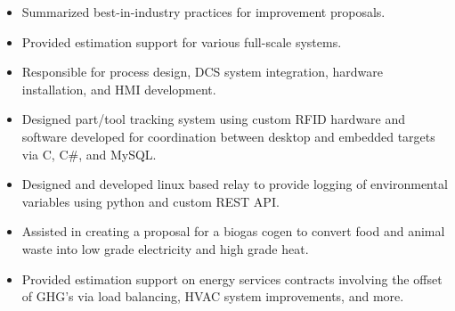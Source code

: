 \documentclass[a4paper,ragged2e,withhyper]{altacv}
\begin{document}
\begin{itemize}
\item Summarized best-in-industry practices for improvement proposals.\\
\item Provided estimation support for various full-scale systems.\\
\item Responsible for process design, DCS system integration, hardware installation, and HMI development.\\
\item Designed part/tool tracking system using custom RFID hardware and software developed for coordination between desktop and embedded targets via C, C\#, and MySQL.\\
\end{itemize}

\divider


\begin{itemize}
\item Designed and developed linux based relay to provide logging of environmental variables using python and custom REST API.\\
\item Assisted in creating a proposal for a biogas cogen to convert food and animal waste into low grade electricity and high grade heat.\\
\item Provided estimation support on energy services contracts involving the offset of GHG's via load balancing, HVAC system improvements, and more.\\
\end{itemize}
\end{document}
